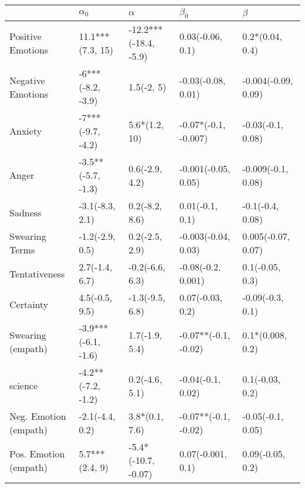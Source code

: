 \begin{tabular}{lllll}
\toprule
{} &           $\alpha_0$ &               $\alpha$ &             $\beta_0$ &              $\beta$ \\
\midrule
Positive Emotions     &     11.1***(7.3, 15) &  -12.2***(-18.4, -5.9) &      0.03(-0.06, 0.1) &      0.2*(0.04, 0.4) \\
Negative Emotions     &    -6***(-8.2, -3.9) &             1.5(-2, 5) &    -0.03(-0.08, 0.01) &  -0.004(-0.09, 0.09) \\
Anxiety               &    -7***(-9.7, -4.2) &          5.6*(1.2, 10) &  -0.07*(-0.1, -0.007) &    -0.03(-0.1, 0.08) \\
Anger                 &   -3.5**(-5.7, -1.3) &         0.6(-2.9, 4.2) &   -0.001(-0.05, 0.05) &   -0.009(-0.1, 0.08) \\
Sadness               &      -3.1(-8.3, 2.1) &         0.2(-8.2, 8.6) &       0.01(-0.1, 0.1) &     -0.1(-0.4, 0.08) \\
Swearing Terms        &      -1.2(-2.9, 0.5) &         0.2(-2.5, 2.9) &   -0.003(-0.04, 0.03) &   0.005(-0.07, 0.07) \\
Tentativeness         &       2.7(-1.4, 6.7) &        -0.2(-6.6, 6.3) &    -0.08(-0.2, 0.001) &      0.1(-0.05, 0.3) \\
Certainty             &       4.5(-0.5, 9.5) &        -1.3(-9.5, 6.8) &      0.07(-0.03, 0.2) &     -0.09(-0.3, 0.1) \\
Swearing (empath)     &  -3.9***(-6.1, -1.6) &         1.7(-1.9, 5.4) &  -0.07**(-0.1, -0.02) &     0.1*(0.008, 0.2) \\
science               &   -4.2**(-7.2, -1.2) &         0.2(-4.6, 5.1) &     -0.04(-0.1, 0.02) &      0.1(-0.03, 0.2) \\
Neg. Emotion (empath) &      -2.1(-4.4, 0.2) &         3.8*(0.1, 7.6) &  -0.07**(-0.1, -0.02) &    -0.05(-0.1, 0.05) \\
Pos. Emotion (empath) &       5.7***(2.4, 9) &    -5.4*(-10.7, -0.07) &     0.07(-0.001, 0.1) &     0.09(-0.05, 0.2) \\
\bottomrule
\end{tabular}
